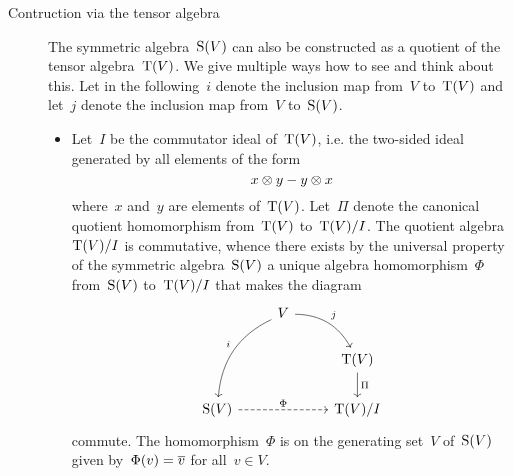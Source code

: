 \begin{recall}
\begin{description}
    \item[Contruction via the tensor algebra]
      The symmetric algebra~$\operatorname{S}(V)$ can also be constructed as a quotient of the tensor algebra~$\operatorname{T}(V)$.
      We give multiple ways how to see and think about this.
      Let in the following~$i$ denote the inclusion map from~$V$ to~$\operatorname{T}(V)$ and let~$j$ denote the inclusion map from~$V$ to~$\operatorname{S}(V)$.
      \begin{itemize}
        \item
          Let~$I$ be the commutator ideal of~$\operatorname{T}(V)$, i.e. the two-sided ideal generated by all elements of the form
          \[
            x \otimes y - y \otimes x
          \]
          where~$x$ and~$y$ are elements of~$\operatorname{T}(V)$.
          Let~$\Pi$ denote the canonical quotient homomorphism from~$\operatorname{T}(V)$ to~$\operatorname{T}(V)/I$.
          The quotient algebra~$\operatorname{T}(V)/I$ is commutative, whence there exists by the universal property of the symmetric algebra~$\operatorname{S}(V)$ a unique algebra homomorphism~$\Phi$ from~$\operatorname{S}(V)$ to~$\operatorname{T}(V)/I$ that makes the diagram
          \[
            \begin{tikzcd}
              {}
              &
              V
              \arrow[bend right]{ddl}[above left]{i}
              \arrow[bend left]{dr}[above right]{j}
              &
              {}
              \\
              {}
              &
              {}
              &
              \Tensor(V)
              \arrow{d}[right]{\Pi}
              \\
              \Symm(V)
              \arrow[dashed]{rr}[above]{\Phi}
              &
              {}
              &
              \Tensor(V)/I
            \end{tikzcd}
          \]
          commute.
          The homomorphism~$\Phi$ is on the generating set~$V$ of~$\operatorname{S}(V)$ given by~$\Phi(v) = \overline{v}$ for all~$v \in V$.


\end{itemize}
\end{description}
\end{recall}
